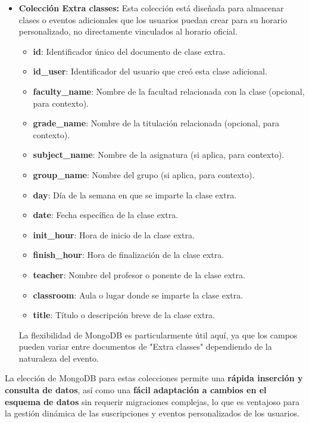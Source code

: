 \begin{itemize}
    \item \textbf{Colección Extra classes:}
    Esta colección está diseñada para almacenar clases o eventos adicionales que los usuarios puedan crear para su horario personalizado, no directamente vinculados al horario oficial.
    \begin{itemize}
        \item \textbf{id}: Identificador único del documento de clase extra.
        \item \textbf{id\_user}: Identificador del usuario que creó esta clase adicional.
        \item \textbf{faculty\_name}: Nombre de la facultad relacionada con la clase (opcional, para contexto).
        \item \textbf{grade\_name}: Nombre de la titulación relacionada (opcional, para contexto).
        \item \textbf{subject\_name}: Nombre de la asignatura (si aplica, para contexto).
        \item \textbf{group\_name}: Nombre del grupo (si aplica, para contexto).
        \item \textbf{day}: Día de la semana en que se imparte la clase extra.
        \item \textbf{date}: Fecha específica de la clase extra.
        \item \textbf{init\_hour}: Hora de inicio de la clase extra.
        \item \textbf{finish\_hour}: Hora de finalización de la clase extra.
        \item \textbf{teacher}: Nombre del profesor o ponente de la clase extra.
        \item \textbf{classroom}: Aula o lugar donde se imparte la clase extra.
        \item \textbf{title}: Título o descripción breve de la clase extra.
    \end{itemize}
    La flexibilidad de MongoDB es particularmente útil aquí, ya que los campos pueden variar entre documentos de "Extra classes" dependiendo de la naturaleza del evento.
\end{itemize}

La elección de MongoDB para estas colecciones permite una \textbf{rápida inserción y consulta de datos}, así como una \textbf{fácil adaptación a cambios en el esquema de datos} sin requerir migraciones complejas, lo que es ventajoso para la gestión dinámica de las suscripciones y eventos personalizados de los usuarios.


